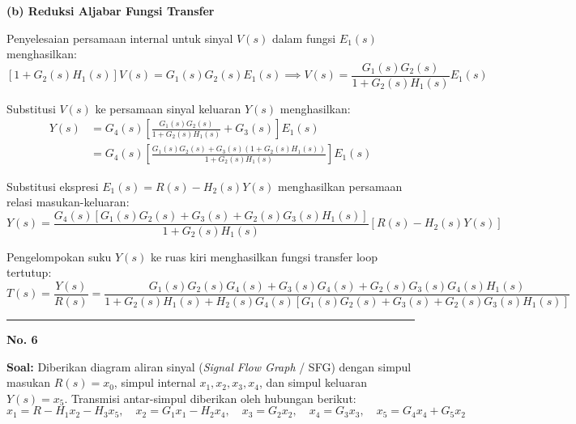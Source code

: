 \documentclass[11pt,a4paper]{article}
\begin{document}
\textbf{(b) Reduksi Aljabar Fungsi Transfer}

Penyelesaian persamaan internal untuk sinyal $V(s)$ dalam fungsi $E_1(s)$ menghasilkan:
$$[1 + G_2(s) H_1(s)] V(s) = G_1(s) G_2(s) E_1(s) \implies V(s) = \frac{G_1(s) G_2(s)}{1 + G_2(s) H_1(s)} E_1(s)$$

Substitusi $V(s)$ ke persamaan sinyal keluaran $Y(s)$ menghasilkan:
\begin{align*}
    Y(s) &= G_4(s) \left[ \frac{G_1(s) G_2(s)}{1 + G_2(s) H_1(s)} + G_3(s) \right] E_1(s) \\
    &= G_4(s) \left[ \frac{G_1(s) G_2(s) + G_3(s)(1 + G_2(s) H_1(s))}{1 + G_2(s) H_1(s)} \right] E_1(s)
\end{align*}

Substitusi ekspresi $E_1(s) = R(s) - H_2(s) Y(s)$ menghasilkan persamaan relasi masukan-keluaran:
$$Y(s) = \frac{G_4(s) [G_1(s) G_2(s) + G_3(s) + G_2(s) G_3(s) H_1(s)]}{1 + G_2(s) H_1(s)} [R(s) - H_2(s) Y(s)]$$

Pengelompokan suku $Y(s)$ ke ruas kiri menghasilkan fungsi transfer loop tertutup:
$$T(s) = \frac{Y(s)}{R(s)} = \frac{G_1(s) G_2(s) G_4(s) + G_3(s) G_4(s) + G_2(s) G_3(s) G_4(s) H_1(s)}{1 + G_2(s) H_1(s) + H_2(s) G_4(s) [G_1(s) G_2(s) + G_3(s) + G_2(s) G_3(s) H_1(s)]}$$

\vspace{12pt}
\hrule
\vspace{10pt}

\textbf{\large No. 6}

\textbf{Soal:}  
Diberikan diagram aliran sinyal (\textit{Signal Flow Graph} / SFG) dengan simpul masukan $R(s) = x_0$, simpul internal $x_1, x_2, x_3, x_4$, dan simpul keluaran $Y(s) = x_5$. Transmisi antar-simpul diberikan oleh hubungan berikut:
$$x_1 = R - H_1 x_2 - H_3 x_5, \quad x_2 = G_1 x_1 - H_2 x_4, \quad x_3 = G_2 x_2, \quad x_4 = G_3 x_3, \quad x_5 = G_4 x_4 + G_5 x_2$$
\end{document}
